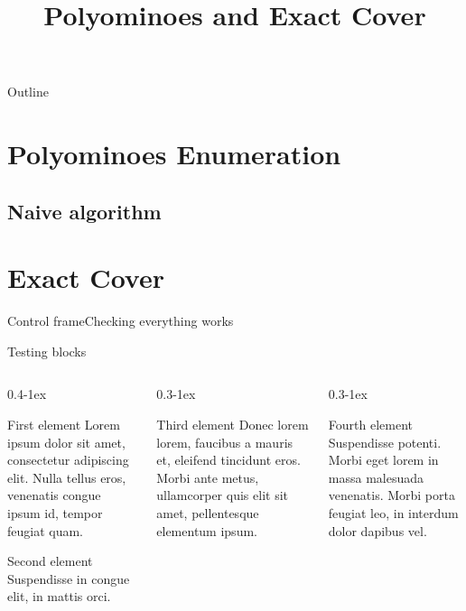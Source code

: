 \documentclass[aspectratio=169]{beamer}
\title[--- Ke WANG \& Shiwen XIA]
      {Polyominoes and Exact Cover}
\begin{document}
\maketitle


\begin{frame}{Outline}
	\tableofcontents
\end{frame}

\section{Polyominoes Enumeration}
	\subsection{Naive algorithm}

\section{Exact Cover}

\begin{frame}{Control frame}{Checking everything works}
  \lipsum[1]
\end{frame}

\begin{frame}{Testing blocks}
  \begin{columns}[t,onlytextwidth]
    \begin{column}{0.4\textwidth-1ex}
      \begin{block}{First element}
        Lorem ipsum dolor sit amet, consectetur adipiscing elit. Nulla tellus eros, venenatis congue ipsum id, tempor feugiat quam.
      \end{block}
      \begin{block}{Second element}
        Suspendisse in congue elit, in mattis orci.
      \end{block}
    \end{column}

    \begin{column}{0.3\textwidth-1ex}
      \begin{block}{Third element}
        Donec lorem lorem, faucibus a mauris et, eleifend tincidunt eros. Morbi ante metus, ullamcorper quis elit sit amet, pellentesque elementum ipsum.
      \end{block}
    \end{column}

    \begin{column}{0.3\textwidth-1ex}
      \begin{block}{Fourth element}
        Suspendisse potenti. Morbi eget lorem in massa malesuada venenatis. Morbi porta feugiat leo, in interdum dolor dapibus vel.
      \end{block}
    \end{column}
  \end{columns}
\end{frame}
\end{document}
